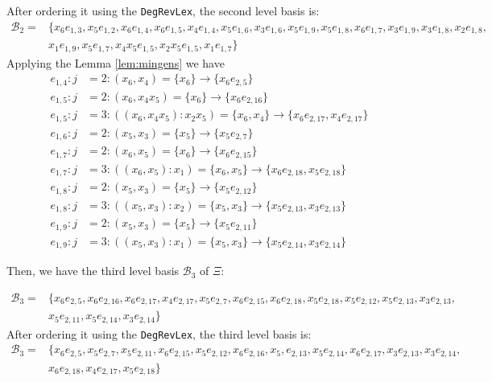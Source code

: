 \documentclass{article}
\theoremstyle{definition}
\theoremstyle{remark}
\theoremstyle{example}
\begin{document}
After ordering it using the \verb+DegRevLex+, the second level basis is:
\begin{equation}
    \begin{aligned}
        \mathcal{B}_2 = &\{x_6e_{1,3},x_5e_{1,2},x_6e_{1,4},x_6e_{1,5},x_4e_{1,4},x_5e_{1,6},x_3e_{1,6},x_5e_{1,9},x_5e_{1,8},x_6e_{1,7},x_3e_{1,9},x_3e_{1,8},x_2e_{1,8},\\
        &x_1e_{1,9},x_5e_{1,7},x_4x_5e_{1,5},x_2x_5e_{1,5},x_1e_{1,7}\}
    \end{aligned}
\end{equation}
Applying the Lemma \ref{lem:mingens} we have
\begin{align}
    e_{1,4}: j &= 2: (x_6,x_4) = \{x_6\} \rightarrow\{x_6e_{2,5}\}\\
    e_{1,5}: j &= 2: (x_6,x_4x_5) = \{x_6\} \rightarrow\{x_6e_{2,16}\}\\
    e_{1,5}: j &= 3: ((x_6,x_4x_5):x_2x_5) = \{x_6,x_4\} \rightarrow\{x_6e_{2,17},x_4e_{2,17}\}\\
    e_{1,6}: j &= 2: (x_5,x_3) = \{x_5\} \rightarrow\{x_5e_{2,7}\}\\
    e_{1,7}: j &= 2: (x_6,x_5) = \{x_6\} \rightarrow\{x_6e_{2,15}\}\\
    e_{1,7}: j &= 3: ((x_6,x_5):x_1) = \{x_6,x_5\} \rightarrow\{x_6e_{2,18},x_5e_{2,18}\}\\
    e_{1,8}: j &= 2: (x_5,x_3) = \{x_5\} \rightarrow\{x_5e_{2,12}\}\\
    e_{1,8}: j &= 3: ((x_5,x_3):x_2) = \{x_5,x_3\} \rightarrow\{x_5e_{2,13},x_3e_{2,13}\}\\
    e_{1,9}: j &= 2: (x_5,x_3) = \{x_5\} \rightarrow\{x_5e_{2,11}\}\\
    e_{1,9}: j &= 3: ((x_5,x_3):x_1) = \{x_5,x_3\} \rightarrow\{x_5e_{2,14},x_3e_{2,14}\}
\end{align}

Then, we have the third level basis $\mathcal{B}_3$ of $\Xi$:

\begin{equation}
    \begin{aligned}
        \mathcal{B}_3 = &\{x_6e_{2,5},x_6e_{2,16},x_6e_{2,17},x_4e_{2,17},x_5e_{2,7},x_6e_{2,15},x_6e_{2,18},x_5e_{2,18},x_5e_{2,12},x_5e_{2,13},x_3e_{2,13},\\
        &x_5e_{2,11},x_5e_{2,14},x_3e_{2,14}\}
    \end{aligned}
\end{equation}
After ordering it using the \verb+DegRevLex+, the third level basis is:
\begin{equation}
    \begin{aligned}
        \mathcal{B}_3 = &\{x_6e_{2,5},x_5e_{2,7},x_5e_{2,11},x_6e_{2,15},x_5e_{2,12},x_6e_{2,16},x_5,e_{2,13},x_5e_{2,14},x_6e_{2,17},x_3e_{2,13},x_3e_{2,14},\\
        & x_6e_{2,18},x_4e_{2,17},x_5e_{2,18}\}
    \end{aligned}
\end{equation}
\end{document}

